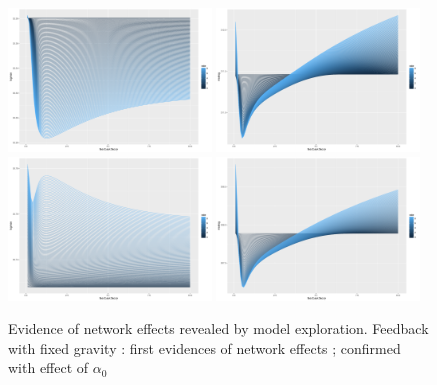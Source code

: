 \documentclass[Royal,sageh,times]{sagej}
\begin{document}



\begin{figure}
\centering
\includegraphics[width=0.48\textwidth]{figures/logmse-feedbackDecay_ZOOM}
\includegraphics[width=0.48\textwidth]{figures/mselog-feedbackDecay_ZOOM}\\
\includegraphics[width=0.48\textwidth]{figures/logmse-feedbackDecay_ZOOM_fixedgravity}
\includegraphics[width=0.48\textwidth]{figures/mselog-feedbackDecay_ZOOM_fixedgravity}
\caption{Evidence of network effects revealed by model exploration. Feedback with fixed gravity : first evidences of network effects ; confirmed with effect of $\alpha_0$}
\end{figure}
\end{document}
